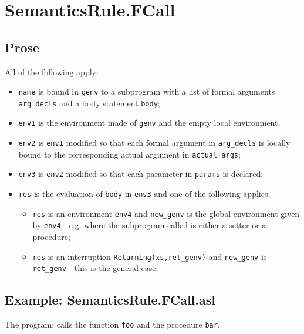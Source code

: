 \documentclass{book}
\begin{document}

\section{SemanticsRule.FCall \label{sec:SemanticsRule.FCall}}

  \subsection{Prose}
  All of the following apply:
  \begin{itemize}
  \item \texttt{name} is bound in \texttt{genv} to a subprogram with a list of formal arguments
    \texttt{arg\_decls} and a body statement \texttt{body};
  \item \texttt{env1} is the environment made of \texttt{genv} and the empty local environment,
  \item \texttt{env2} is \texttt{env1} modified so that each formal argument in \texttt{arg\_decls} is
    locally bound to the corresponding actual argument in \texttt{actual\_args};
  \item \texttt{env3} is \texttt{env2} modified so that each parameter in \texttt{params} is declared;
  \item \texttt{res} is the evaluation of \texttt{body} in \texttt{env3} and one of the following
    applies:
      \begin{itemize}
      \item \texttt{res} is an environment \texttt{env4} and \texttt{new\_genv} is the global environment
        given by \texttt{env4}---e.g. where the subprogram called is either a setter or
        a procedure;
      \item \texttt{res} is an interruption \texttt{Returning(xs,ret\_genv)} and \texttt{new\_genv} is
        \texttt{ret\_genv}---this is the general case.
      \end{itemize}
  \end{itemize}

  \subsection{Example: SemanticsRule.FCall.asl}
  The program:
  calls the function \texttt{foo} and the procedure \texttt{bar}.
\end{document}

